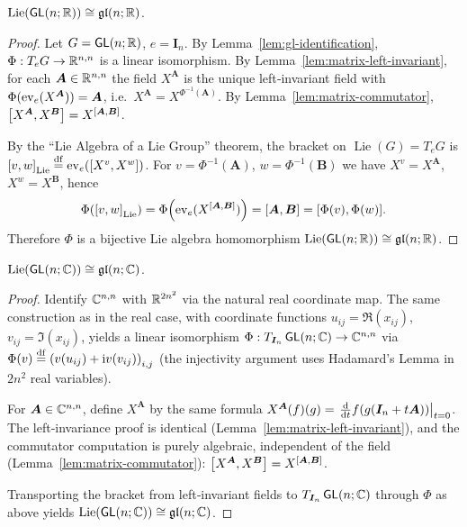 \documentclass[11pt,reqno]{amsart}
\DeclareMathOperator{\Lie}{Lie}
\newcommand{\ii}{\mathrm{i}}
\begin{document}
\begin{Thm}\label{thm:Lie-GLnR}
$\Lie\Br{\GL(n;\R)}\cong\gl(n;\R)$.
\end{Thm}
\begin{proof}
  Let $G=\operatorname{\mathsf{GL}}(n;\mathbb{R})$, $e=\bm I_n$.  By Lemma~\ref{lem:gl-identification},
  $\Phi:T_e G\to\mathbb{R}^{n,n}$ is a linear isomorphism.
  By Lemma~\ref{lem:matrix-left-invariant}, for each $\bm A\in\mathbb{R}^{n,n}$
  the field $X^{\bm A}$ is the unique left‑invariant field with
  $\Phi(\mathrm{ev}_e(X^{\bm A}))=\bm A$, i.e.\ $X^{\bm A}=X^{\Phi^{-1}(\bm A)}$.
  By Lemma~\ref{lem:matrix-commutator},
  $\SqBr{X^{\bm A}, X^{\bm B}} = X^{\SqBr{\bm A,\bm B}}$.

  By the ``Lie Algebra of a Lie Group'' theorem, the bracket on
  $\Lie(G)=T_e G$ is $\SqBr{v,w}_{\Lie}\df\ev_e\Br{\SqBr{X^v,X^w}}$.
  For $v=\Phi^{-1}(\bm A)$, $w=\Phi^{-1}(\bm B)$ we have
  $X^v=X^{\bm A}$, $X^w=X^{\bm B}$, hence
  \[
    \Phi\Br{\SqBr{v,w}_{\Lie}}
    = \Phi\Br{\ev_e(X^{\SqBr{\bm A,\bm B}})}
    = \SqBr{\bm A,\bm B}
    = \SqBr{\Phi(v),\Phi(w)}.
  \]
  Therefore $\Phi$ is a bijective Lie algebra homomorphism
  $\Lie\Br{\GL(n;\R)}\cong\gl(n;\R)$.
\end{proof}

\begin{Thm}\label{thm:Lie-GLnC}
$\Lie\Br{\GL(n;\C)}\cong\gl(n;\C)$.
\end{Thm}
\begin{proof}
  Identify $\mathbb{C}^{n,n}$ with $\mathbb{R}^{2n^2}$ via the natural real coordinate map.
  The same construction as in the real case, with coordinate functions
  $u_{ij}=\Re(x_{ij})$, $v_{ij}=\Im(x_{ij})$, yields a linear isomorphism
  $\Phi:T_{\bm I_n}\operatorname{\mathsf{GL}}(n;\mathbb{C})\to\mathbb{C}^{n,n}$ via
  $\Phi(v)\df\Br{v(u_{ij})+\ii v(v_{ij})}_{i,j}$
  (the injectivity argument uses Hadamard's Lemma in $2n^2$ real variables).

  For $\bm A\in\mathbb{C}^{n,n}$, define $X^{\bm A}$ by the same formula
  $X^{\bm A}(f)(g)=\eval{\frac{\dd}{\dd t}f(g(\bm I_n+t\bm A))}_{t=0}$.
  The left‑invariance proof is identical (Lemma~\ref{lem:matrix-left-invariant}),
  and the commutator computation is purely algebraic, independent of the field
  (Lemma~\ref{lem:matrix-commutator}):
  $\SqBr{X^{\bm A},X^{\bm B}}=X^{\SqBr{\bm A,\bm B}}$.

  Transporting the bracket from left‑invariant fields to $T_{\bm I_n}\operatorname{\mathsf{GL}}(n;\mathbb{C})$
  through $\Phi$ as above yields $\Lie\Br{\GL(n;\C)}\cong\gl(n;\C)$.
\end{proof}
\end{document}
